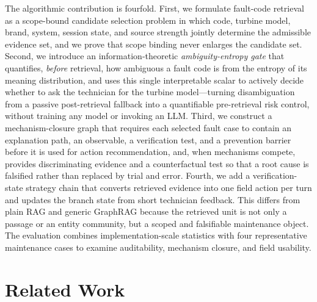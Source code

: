 \documentclass[lettersize,journal]{IEEEtran}
\begin{document}
The algorithmic contribution is fourfold. First, we formulate fault-code retrieval as a scope-bound candidate selection problem in which code, turbine model, brand, system, session state, and source strength jointly determine the admissible evidence set, and we prove that scope binding never enlarges the candidate set. Second, we introduce an information-theoretic \emph{ambiguity-entropy gate} that quantifies, \emph{before} retrieval, how ambiguous a fault code is from the entropy of its meaning distribution, and uses this single interpretable scalar to actively decide whether to ask the technician for the turbine model---turning disambiguation from a passive post-retrieval fallback into a quantifiable pre-retrieval risk control, without training any model or invoking an LLM. Third, we construct a mechanism-closure graph that requires each selected fault case to contain an explanation path, an observable, a verification test, and a prevention barrier before it is used for action recommendation, and, when mechanisms compete, provides discriminating evidence and a counterfactual test so that a root cause is falsified rather than replaced by trial and error. Fourth, we add a verification-state strategy chain that converts retrieved evidence into one field action per turn and updates the branch state from short technician feedback. This differs from plain RAG and generic GraphRAG because the retrieved unit is not only a passage or an entity community, but a scoped and falsifiable maintenance object. The evaluation combines implementation-scale statistics with four representative maintenance cases to examine auditability, mechanism closure, and field usability.

\section{Related Work}
\end{document}
